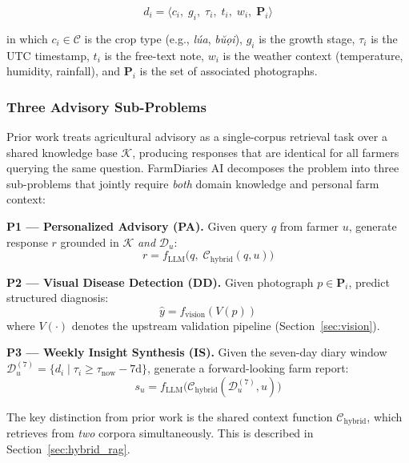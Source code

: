 \documentclass[conference]{IEEEtran}
\begin{document}
\begin{equation}
  d_i = \langle c_i,\; g_i,\; \tau_i,\; t_i,\; w_i,\; \mathbf{P}_i \rangle
\end{equation}

\noindent in which $c_i \in \mathcal{C}$ is the crop type
(e.g., \textit{l\'{u}a}, \textit{b\u{u}\d{o}i}), $g_i$ is the growth
stage, $\tau_i$ is the UTC timestamp, $t_i$ is the free-text note,
$w_i$ is the weather context (temperature, humidity, rainfall), and
$\mathbf{P}_i$ is the set of associated photographs.

\subsubsection{Three Advisory Sub-Problems}

Prior work \cite{pinto2023,sharma2023} treats agricultural advisory as a
single-corpus retrieval task over a shared knowledge base $\mathcal{K}$,
producing responses that are identical for all farmers querying the same
question. FarmDiaries AI decomposes the problem into three sub-problems
that jointly require \emph{both} domain knowledge and personal farm
context:

\textbf{P1 --- Personalized Advisory (PA).}
Given query $q$ from farmer $u$, generate response $r$ grounded in
$\mathcal{K}$ \emph{and} $\mathcal{D}_u$:
\begin{equation}
  r = f_{\mathrm{LLM}}\!\bigl(q,\;\mathcal{C}_{\mathrm{hybrid}}(q,u)\bigr)
  \label{eq:pa}
\end{equation}

\textbf{P2 --- Visual Disease Detection (DD).}
Given photograph $p \in \mathbf{P}_i$, predict structured diagnosis:
\begin{equation}
  \hat{y} = f_{\mathrm{vision}}(V(p))
  \label{eq:dd}
\end{equation}
where $V(\cdot)$ denotes the upstream validation pipeline
(Section~\ref{sec:vision}).

\textbf{P3 --- Weekly Insight Synthesis (IS).}
Given the seven-day diary window
$\mathcal{D}_u^{(7)} = \{d_i \mid \tau_i \ge \tau_{\mathrm{now}} - 7\mathrm{d}\}$,
generate a forward-looking farm report:
\begin{equation}
  s_u = f_{\mathrm{LLM}}\!\bigl(\mathcal{C}_{\mathrm{hybrid}}
  (\mathcal{D}_u^{(7)}, u)\bigr)
  \label{eq:is}
\end{equation}

The key distinction from prior work is the shared context function
$\mathcal{C}_{\mathrm{hybrid}}$, which retrieves from \emph{two}
corpora simultaneously. This is described in
Section~\ref{sec:hybrid_rag}.
\end{document}
